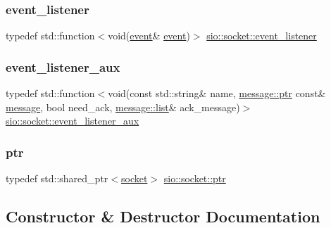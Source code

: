 \mbox{\label{classsio_1_1socket_ae0b1d93ef97af0d6d4f588e1e2a103b5}} 
\subsubsection{\texorpdfstring{event\+\_\+listener}{event\_listener}}
{\footnotesize\ttfamily typedef std\+::function$<$void(\hyperlink{classsio_1_1event}{event}\& \hyperlink{classsio_1_1event}{event})$>$ \hyperlink{classsio_1_1socket_ae0b1d93ef97af0d6d4f588e1e2a103b5}{sio\+::socket\+::event\+\_\+listener}}

\mbox{\label{classsio_1_1socket_a426d9236f95762375d3b86caa2b4faaf}} 
\subsubsection{\texorpdfstring{event\+\_\+listener\+\_\+aux}{event\_listener\_aux}}
{\footnotesize\ttfamily typedef std\+::function$<$void(const std\+::string\& name, \hyperlink{classsio_1_1message_a6340b6fef57e4516eb17928b1885a615}{message\+::ptr} const\& \hyperlink{classsio_1_1message}{message}, bool need\+\_\+ack, \hyperlink{classsio_1_1message_1_1list}{message\+::list}\& ack\+\_\+message)$>$ \hyperlink{classsio_1_1socket_a426d9236f95762375d3b86caa2b4faaf}{sio\+::socket\+::event\+\_\+listener\+\_\+aux}}

\mbox{\label{classsio_1_1socket_afb4f5829acfc5c8181ddb7174c501593}} 
\subsubsection{\texorpdfstring{ptr}{ptr}}
{\footnotesize\ttfamily typedef std\+::shared\+\_\+ptr$<$\hyperlink{classsio_1_1socket}{socket}$>$ \hyperlink{classsio_1_1socket_afb4f5829acfc5c8181ddb7174c501593}{sio\+::socket\+::ptr}}



\subsection{Constructor \& Destructor Documentation}
\mbox{\label{classsio_1_1socket_a801ded60fce567ad253a3c2740b79ddf}} 
